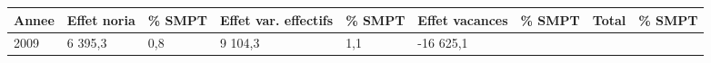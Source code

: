 \begin{longtable}[]{@{}lllllllll@{}}
\toprule
\begin{minipage}[b]{0.05\columnwidth}\raggedright
Annee\strut
\end{minipage} & \begin{minipage}[b]{0.10\columnwidth}\raggedright
Effet noria\strut
\end{minipage} & \begin{minipage}[b]{0.06\columnwidth}\raggedright
\% SMPT\strut
\end{minipage} & \begin{minipage}[b]{0.16\columnwidth}\raggedright
Effet var. effectifs\strut
\end{minipage} & \begin{minipage}[b]{0.06\columnwidth}\raggedright
\% SMPT\strut
\end{minipage} & \begin{minipage}[b]{0.12\columnwidth}\raggedright
Effet vacances\strut
\end{minipage} & \begin{minipage}[b]{0.06\columnwidth}\raggedright
\% SMPT\strut
\end{minipage} & \begin{minipage}[b]{0.09\columnwidth}\raggedright
Total\strut
\end{minipage} & \begin{minipage}[b]{0.06\columnwidth}\raggedright
\% SMPT\strut
\end{minipage}\tabularnewline
\midrule
\endhead
\begin{minipage}[t]{0.05\columnwidth}\raggedright
2009\strut
\end{minipage} & \begin{minipage}[t]{0.10\columnwidth}\raggedright
6 395,3\strut
\end{minipage} & \begin{minipage}[t]{0.06\columnwidth}\raggedright
0,8\strut
\end{minipage} & \begin{minipage}[t]{0.16\columnwidth}\raggedright
9 104,3\strut
\end{minipage} & \begin{minipage}[t]{0.06\columnwidth}\raggedright
1,1\strut
\end{minipage} & \begin{minipage}[t]{0.12\columnwidth}\raggedright
-16 625,1\strut
\end{minipage} & \begin{minipage}[t]{0.06\columnwidth}\raggedright

\end{minipage}
\end{longtable}
